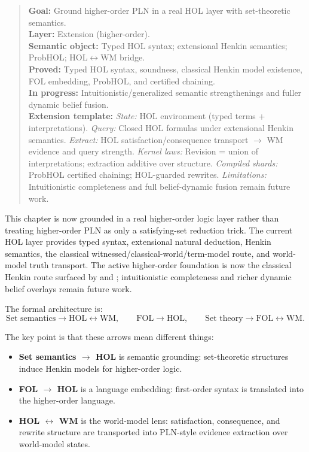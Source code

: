 \documentclass[11pt,openany]{report}
\begin{document}
\begin{quote}\small
\textbf{Goal:} Ground higher-order PLN in a real HOL layer with set-theoretic semantics.\\
\textbf{Layer:} Extension (higher-order).\\
\textbf{Semantic object:} Typed HOL syntax; extensional Henkin semantics; ProbHOL; HOL$\leftrightarrow$WM bridge.\\
\textbf{Proved:} Typed HOL syntax, soundness, classical Henkin model existence, FOL embedding, ProbHOL, and certified chaining.\\
\textbf{In progress:} Intuitionistic/generalized semantic strengthenings and fuller dynamic belief fusion.\\[4pt]
\textbf{Extension template:}
\textit{State:} HOL environment (typed terms + interpretations).
\textit{Query:} Closed HOL formulas under extensional Henkin semantics.
\textit{Extract:} HOL satisfaction/consequence transport $\to$ WM evidence and query strength.
\textit{Kernel laws:} Revision = union of interpretations; extraction additive over structure.
\textit{Compiled shards:} ProbHOL certified chaining; HOL-guarded rewrites.
\textit{Limitations:} Intuitionistic completeness and full belief-dynamic fusion remain future work.
\end{quote}

This chapter is now grounded in a real higher-order logic layer rather than
treating higher-order PLN as only a satisfying-set reduction trick.
The current HOL layer provides typed syntax, extensional natural deduction,
Henkin semantics, the classical witnessed/classical-world/term-model route,
and world-model truth transport.
The active higher-order foundation is now the classical Henkin route surfaced by
 and
;
intuitionistic completeness and richer dynamic belief overlays remain future
work.

The formal architecture is:
\[
  \text{Set semantics} \longrightarrow \text{HOL} \longleftrightarrow \text{WM},
  \qquad
  \text{FOL} \longrightarrow \text{HOL},
  \qquad
  \text{Set theory} \longrightarrow \text{FOL} \longleftrightarrow \text{WM}.
\]

The key point is that these arrows mean different things:
\begin{itemize}
\item \textbf{Set semantics $\to$ HOL} is semantic grounding: set-theoretic
  structures induce Henkin models for higher-order logic.
\item \textbf{FOL $\to$ HOL} is a language embedding: first-order syntax is
  translated into the higher-order language.
\item \textbf{HOL $\leftrightarrow$ WM} is the world-model lens: satisfaction,
  consequence, and rewrite structure are transported into PLN-style evidence
  extraction over world-model states.
\end{itemize}
\end{document}
